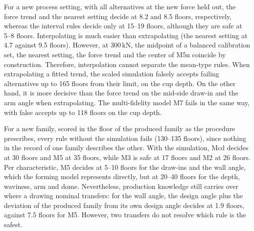 \documentclass[pdflatex,sn-basic,lineno]{sn-jnl}
\providecommand{\DIFadd}[1]{{\protect\color{blue}\uwave{#1}}} %
\providecommand{\DIFaddbegin}{} %
\providecommand{\DIFaddend}{} %
\newcommand{\DIFaddincludegraphics}[2][]{{\color{blue}\fbox{\DIFOincludegraphics[#1]{#2}}}} %
\DeclareRobustCommand{\DIFaddbegin}{\DIFOaddbegin \let\includegraphics\DIFaddincludegraphics} %
\DeclareRobustCommand{\DIFaddend}{\DIFOaddend \let\includegraphics\DIFOincludegraphics} %
\begin{document}
For a new process setting, with all alternatives at the new force held out, the force trend and the nearest setting decide at 8.2 and 8.5 floors, respectively, whereas the interval rules decide only at 15--19 floors, although they are safe at 5--8 floors. Interpolating is much easier than extrapolating (the nearest setting at 4.7 against 9.5 floors). However, at 300\,kN, the midpoint of a balanced calibration set, the nearest setting, the force trend and the center of M5n coincide by construction. Therefore, interpolation cannot separate the mean-type rules. When extrapolating a fitted trend, the scaled simulation falsely accepts failing alternatives up to 165 floors from their limit, on the cup depth. On the other hand, it is more decisive than the force trend on the mid-side draw-in and the arm angle when extrapolating. The multi-fidelity model M7 fails in the same way, with false accepts up to 118 floors on the cup depth.

For a new family, scored in the floor of the produced family as the procedure prescribes, every rule without the simulation fails (130--135 floors\DIFaddbegin \DIFadd{; NN+RM 293}\DIFaddend ), since nothing in the record of one family describes the other. With the simulation, Mcd decides at 30 floors and M5 at 35 floors, while M3 is safe at 17 floors and M2 at 26 floors. Per characteristic, M5 decides at 5--10 floors for the draw-ins and the wall angle, which the forming model represents directly, but at 20--40 floors for the depth, waviness, arm and dome. Nevertheless, production knowledge still carries over where a drawing nominal transfers: for the wall angle, the design angle plus the deviation of the produced family from its own design angle decides at 1.9 floors, against 7.5 floors for M5. However, two transfers do not resolve which rule is the safest.
\end{document}
